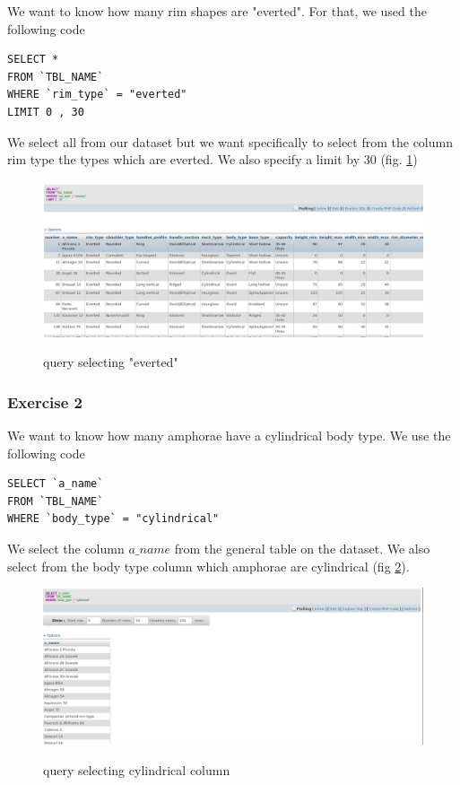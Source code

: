 \documentclass[10pt,a4paper]{article}
\begin{document}
We want to know how many rim shapes are "everted". For that, we used the following code

\begin{verbatim}
SELECT *
FROM `TBL_NAME`
WHERE `rim_type` = "everted"
LIMIT 0 , 30
\end{verbatim}


We select all from our dataset but we want specifically to select from the column rim type the types which are everted. We also specify a limit by 30 (fig. \ref{query1})

\begin{figure}[hdp]
\centering
\includegraphics[scale=0.30]{output_query1.png}
\label{query1}
\caption{query selecting "everted"}
\end{figure} 


\subsubsection{Exercise 2}

We want to know how many amphorae have a cylindrical body type. We use the following code

\begin{verbatim}
SELECT `a_name`
FROM `TBL_NAME`
WHERE `body_type` = "cylindrical"
\end{verbatim}

We select the column $a\_name$ from the general table on the dataset. We also select from the body type column which amphorae are cylindrical (fig \ref{query2}). 

\begin{figure}[hdp]
\centering
\includegraphics[scale=0.30]{query2.png}
\label{query2}
\caption{query selecting cylindrical column}
\end{figure} 
\end{document}

